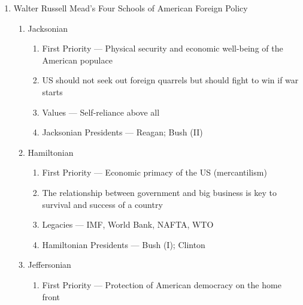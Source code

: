 \documentclass[12pt]{article}
\begin{document}
\begin{enumerate}
\begin{enumerate}
        \end{enumerate}

      \item Walter Russell Mead's Four Schools of American Foreign Policy

        \begin{enumerate}

          \item Jacksonian

            \begin{enumerate}

              \item First Priority — Physical security and economic well-being of the American populace

              \item US should not seek out foreign quarrels but should fight to win if war starts

              \item Values — Self-reliance above all

              \item Jacksonian Presidents — Reagan; Bush (II)

            \end{enumerate}

          \item Hamiltonian

            \begin{enumerate}

              \item First Priority — Economic primacy of the US (mercantilism)

              \item The relationship between government and big business is key to survival and success of a country

              \item Legacies — IMF, World Bank, NAFTA, WTO

              \item Hamiltonian Presidents — Bush (I); Clinton

            \end{enumerate}

          \item Jeffersonian

            \begin{enumerate}

              \item First Priority — Protection of American democracy on the home front


\end{enumerate}
\end{enumerate}
\end{enumerate}
\end{document}

